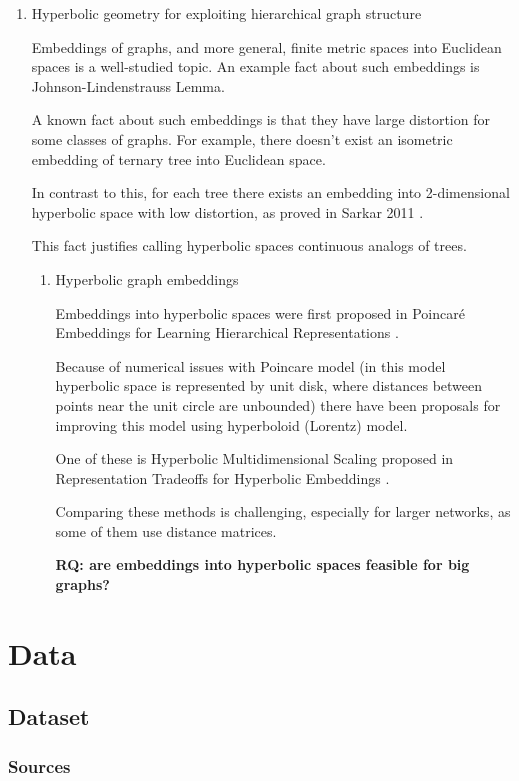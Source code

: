 \documentclass[11pt]{report}
\begin{document}
\begin{enumerate}
\item Hyperbolic geometry for exploiting hierarchical graph structure


Embeddings of graphs, and more general, finite metric spaces into Euclidean spaces is a well-studied topic.
An example fact about such embeddings is Johnson-Lindenstrauss Lemma.

A known fact about such embeddings is that they have large distortion for some classes of graphs. For example, there doesn't exist an isometric embedding of ternary tree into Euclidean space.

In contrast to this, for each tree there exists an embedding into 2-dimensional hyperbolic space with low distortion, as proved in Sarkar 2011 \cite{sarkar}.

This fact justifies calling hyperbolic spaces continuous analogs of trees.

\begin{enumerate}
\item Hyperbolic graph embeddings

     Embeddings into hyperbolic spaces were first proposed in Poincaré Embeddings for
Learning Hierarchical Representations \cite{poincare}.

Because of numerical issues with Poincare model (in this model hyperbolic space is represented by unit disk, where distances between points near the unit circle are unbounded) there have been proposals for improving this model using hyperboloid (Lorentz) model.

One of these is Hyperbolic Multidimensional Scaling proposed in Representation Tradeoffs for Hyperbolic Embeddings \cite{tradeoffs}.

Comparing these methods is challenging, especially for larger networks, as some of them use distance matrices.

\textbf{\textbf{RQ: are embeddings into hyperbolic spaces feasible for big graphs?}}
\end{enumerate}
\end{enumerate}


\chapter{Data}


\section{Dataset}
\subsection{Sources}
\end{document}
